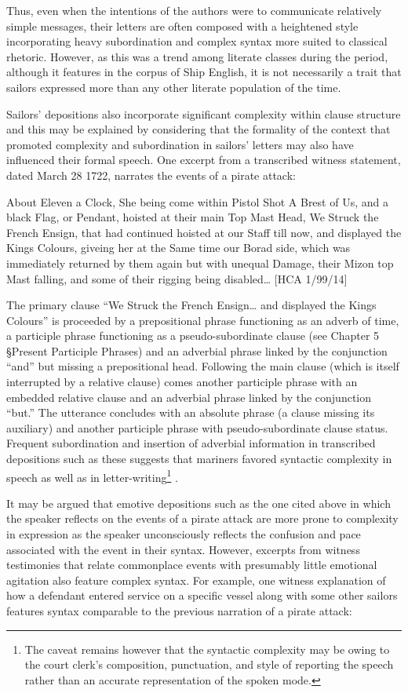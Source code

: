 Thus, even when the intentions of the authors were to communicate relatively simple messages, their letters are often composed with a heightened style incorporating heavy subordination and complex syntax more suited to classical rhetoric. However, as this was a trend among literate classes during the period, although it features in the corpus of Ship English, it is not necessarily a trait that sailors expressed more than any other literate population of the time. 

  Sailors’ depositions also incorporate significant complexity within clause structure and this may be explained by considering that the formality of the context that promoted complexity and subordination in sailors’ letters may also have influenced their formal speech.  One excerpt from a transcribed witness statement, dated March 28 1722, narrates the events of a pirate attack:

About Eleven a Clock, She being come within Pistol Shot A Brest of Us, and a black Flag, or Pendant, hoisted at their main Top Mast Head, We Struck the French Ensign, that had continued hoisted at our Staff till now, and displayed the Kings Colours, giveing her at the Same time our Borad side, which was immediately returned by them again but with unequal Damage, their Mizon top Mast falling, and some of their rigging being disabled… [HCA 1/99/14] 

The primary clause “We Struck the French Ensign… and displayed the Kings Colours” is proceeded by a prepositional phrase functioning as an adverb of time, a participle phrase functioning as a pseudo-subordinate clause (see Chapter 5 §Present Participle Phrases) and an adverbial phrase linked by the conjunction “and” but missing a prepositional head. Following the main clause (which is itself interrupted by a relative clause) comes another participle phrase with an embedded relative clause and an adverbial phrase linked by the conjunction “but.” The utterance concludes with an absolute phrase (a clause missing its auxiliary) and another participle phrase with pseudo-subordinate clause status. Frequent subordination and insertion of adverbial information in transcribed depositions such as these suggests that mariners favored syntactic complexity in speech as well as in letter-writing\footnote{The caveat remains however that the syntactic complexity may be owing to the court clerk’s composition, punctuation, and style of reporting the speech rather than an accurate representation of the spoken mode.} . 

  It may be argued that emotive depositions such as the one cited above in which the speaker reflects on the events of a pirate attack are more prone to complexity in expression as the speaker unconsciously reflects the confusion and pace associated with the event in their syntax. However, excerpts from witness testimonies that relate commonplace events with presumably little emotional agitation also feature complex syntax. For example, one witness explanation of how a defendant entered service on a specific vessel along with some other sailors features syntax comparable to the previous narration of a pirate attack:

